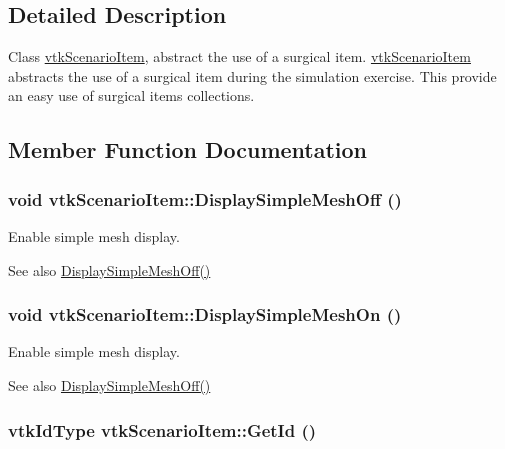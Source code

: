 \subsection{Detailed Description}
Class \hyperlink{classvtkScenarioItem}{vtkScenarioItem}, abstract the use of a surgical item. \hyperlink{classvtkScenarioItem}{vtkScenarioItem} abstracts the use of a surgical item during the simulation exercise. This provide an easy use of surgical items collections. 

\subsection{Member Function Documentation}
\hypertarget{classvtkScenarioItem_ab8c3d0fa282116ca0144cd8fba9545c0}{
\subsubsection[{DisplaySimpleMeshOff}]{\setlength{\rightskip}{0pt plus 5cm}void vtkScenarioItem::DisplaySimpleMeshOff ()}}
\label{classvtkScenarioItem_ab8c3d0fa282116ca0144cd8fba9545c0}


Enable simple mesh display. \begin{DoxySeeAlso}{See also}
\hyperlink{classvtkScenarioItem_ab8c3d0fa282116ca0144cd8fba9545c0}{DisplaySimpleMeshOff()} 
\end{DoxySeeAlso}
\hypertarget{classvtkScenarioItem_a9bd7ffa58d7ed0c8f577d127c1654641}{
\subsubsection[{DisplaySimpleMeshOn}]{\setlength{\rightskip}{0pt plus 5cm}void vtkScenarioItem::DisplaySimpleMeshOn ()}}
\label{classvtkScenarioItem_a9bd7ffa58d7ed0c8f577d127c1654641}


Enable simple mesh display. \begin{DoxySeeAlso}{See also}
\hyperlink{classvtkScenarioItem_ab8c3d0fa282116ca0144cd8fba9545c0}{DisplaySimpleMeshOff()} 
\end{DoxySeeAlso}
\hypertarget{classvtkScenarioItem_a9884061bd42ee058291d95a67ddcac20}{
\subsubsection[{GetId}]{\setlength{\rightskip}{0pt plus 5cm}vtkIdType vtkScenarioItem::GetId ()}}
\label{classvtkScenarioItem_a9884061bd42ee058291d95a67ddcac20}


